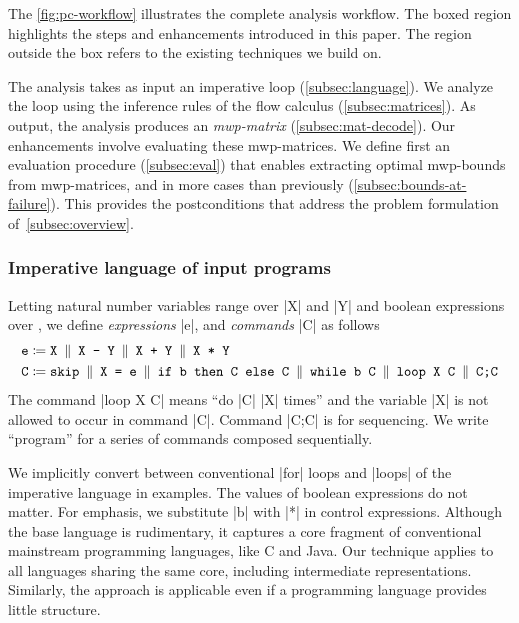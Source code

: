 The \autoref{fig:pc-workflow} illustrates the complete analysis workflow.
The boxed region highlights the steps and enhancements introduced in this paper.
The region outside the box refers to the existing techniques we build on.

The analysis takes as input an imperative loop (\autoref{subsec:language}).
We analyze the loop using the inference rules of the flow calculus (\autoref{subsec:matrices}).
As output, the analysis produces an \emph{mwp-matrix} (\autoref{subsec:mat-decode}).
Our enhancements involve {evaluating} these mwp-matrices.
We define first an {evaluation procedure} (\autoref{subsec:eval}) that enables extracting optimal mwp-bounds from mwp-matrices,
and in more cases than previously (\autoref{subsec:bounds-at-failure}).
This provides the postconditions that address the problem formulation of~\autoref{subsec:overview}.

\subsubsection{Imperative language of input programs}
\label{subsec:language}

\begin{definition}\label{def:lang}
Letting natural number variables range over \pr|X| and \pr|Y| and boolean expressions over ,
we define \emph{expressions} \pr|e|, and \emph{commands} \pr|C| as follows
\begin{align*}
    \text{\pr|e|} \coloneqq{ }&
    \text{\pr| X|} \BNF
    \text{\pr|X - Y|} \BNF
    \text{\pr|X + Y|} \BNF
    \text{\pr|X * Y|} \\
    \text{\pr|C|} \coloneqq{ }&
    \text{\pr| skip|} \BNF
    \text{\pr|X = e|} \BNF
    \text{\pr|if b then C else C|} \BNF
    \text{\pr|while b C|} \BNF
    \text{\pr|loop X C|} \BNF
    \text{\pr|C;C|}
\end{align*}
The command \pr|loop X C| means \enquote{do \pr|{C}| \pr|X| times} and the variable \pr|X| is not allowed to occur in command \pr|C|.
Command \pr|C;C| is for sequencing.
We write \enquote{program} for a series of commands composed sequentially.
\end{definition}
We implicitly convert between conventional \prc|for| loops and \pr|loops| of the imperative language in examples.
The values of boolean expressions do not matter.
For emphasis, we substitute \pr|b| with \pr|*| in control expressions.
Although the base language is rudimentary, it captures a core fragment of conventional mainstream programming languages, like C and Java.
Our technique applies to all languages sharing the same core, including intermediate representations.
Similarly, the approach is applicable even if a programming language provides little structure.

